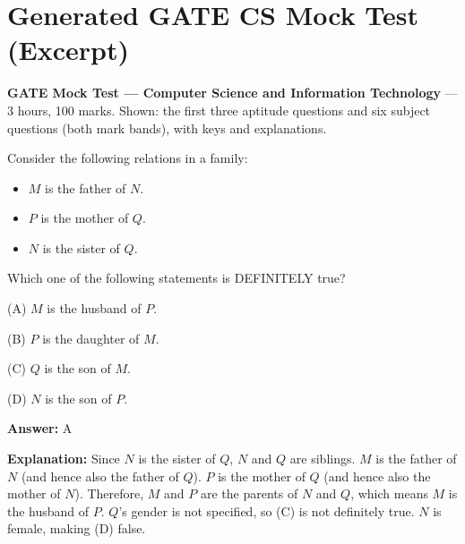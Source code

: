 \section{Generated GATE CS Mock Test (Excerpt)}

\noindent\textbf{GATE Mock Test — Computer Science and Information Technology} --- 3 hours, 100 marks. Shown: the first three aptitude questions and six subject questions (both mark bands), with keys and explanations.\par\medskip

\begin{tcolorbox}[enhanced,breakable,colback=boxgray,colframe=gray!45,boxrule=0.4pt,arc=2pt,left=6pt,right=6pt,top=4pt,bottom=4pt,title={Q.1},fonttitle=\bfseries\small,coltitle=black,colbacktitle=gray!15]
\small Consider the following relations in a family:\par
\begin{itemize}[leftmargin=1.4em,itemsep=1pt]
\item $M$ is the father of $N$.
\item $P$ is the mother of $Q$.
\item $N$ is the sister of $Q$.
\end{itemize}
Which one of the following statements is DEFINITELY true?\par\par\hspace*{1em}(A) $M$ is the husband of $P$.\par\hspace*{1em}(B) $P$ is the daughter of $M$.\par\hspace*{1em}(C) $Q$ is the son of $M$.\par\hspace*{1em}(D) $N$ is the son of $P$.\par{}\par\smallskip\textbf{Answer:} A\par\par\textbf{Explanation:} Since $N$ is the sister of $Q$, $N$ and $Q$ are siblings. $M$ is the father of $N$ (and hence also the father of $Q$). $P$ is the mother of $Q$ (and hence also the mother of $N$). Therefore, $M$ and $P$ are the parents of $N$ and $Q$, which means $M$ is the husband of $P$. $Q$'s gender is not specified, so (C) is not definitely true. $N$ is female, making (D) false.\par
\end{tcolorbox}



